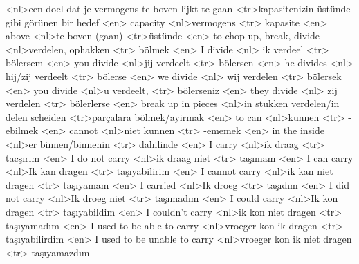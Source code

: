 <nl>een doel dat je vermogens te boven lijkt te  gaan 
<tr>kapasitenizin üstünde gibi görünen bir hedef
<en> capacity 
<nl>vermogens 
<tr> kapasite 
<en> above 
<nl>te boven (gaan) 
<tr>üstünde 
<en> to chop up, break, divide 
<nl>verdelen,  ophakken 
<tr> bölmek 
<en> I divide 
<nl> ik verdeel  
<tr> bölersem  
<en> you divide 
<nl>jij verdeelt  
<tr> bölersen  
<en> he divides 
<nl> hij/zij verdeelt 
<tr> bölerse
<en> we divide 
<nl> wij verdelen 
<tr> bölersek
<en> you divide 
<nl>u verdeelt,  
<tr> bölerseniz 
<en> they divide 
<nl> zij verdelen 
<tr> bölerlerse  
<en> break up in pieces 
<nl>in stukken verdelen/in delen scheiden  
<tr>parçalara bölmek/ayirmak  
<en> to can 
<nl>kunnen 
<tr> -ebilmek
<en> cannot 
<nl>niet kunnen 
<tr> -ememek  
<en> in the inside 
<nl>er binnen/binnenin 
<tr> dahilinde 
<en> I carry 
<nl>ik draag 
<tr> tac\c{s}\i r\i m
<en> I do not carry 
<nl>ik draag niet 
<tr> taşımam 
<en> I can carry 
<nl>Ik kan dragen 
<tr> taşıyabilirim 
<en> I cannot carry 
<nl>ik kan niet dragen 
<tr> taşıyamam 
<en> I carried 
<nl>Ik droeg 
<tr> taşıdım
<en> I did not  carry 
<nl>Ik droeg niet 
<tr> taşımadım 
<en> I could carry 
<nl>Ik kon dragen 
<tr> taşıyabildim 
<en> I couldn't carry 
<nl>ik kon niet dragen 
<tr> taşıyamadım  
<en> I used to be  able to carry 
<nl>vroeger kon ik dragen 
<tr> taşıyabilirdim 
<en> I used to be unable to carry 
<nl>vroeger kon ik niet dragen 
<tr> taşıyamazdım 
